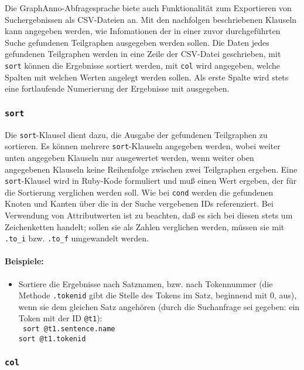 \documentclass[12pt]{scrartcl}
\begin{document}
Die GraphAnno-Abfragesprache biete auch Funktionalität zum Exportieren von Suchergebnissen als CSV-Dateien an. 
Mit den nachfolgen beschriebenen Klauseln kann angegeben werden, wie Infomationen der in einer zuvor durchgeführten Suche gefundenen Teilgraphen ausgegeben werden sollen.
Die Daten jedes gefundenen Teilgraphen werden in eine Zeile der CSV-Datei geschrieben, mit \texttt{sort} können die Ergebnisse sortiert werden, mit \texttt{col} wird angegeben, welche Spalten mit welchen Werten angelegt werden sollen. Als erste Spalte wird stets eine fortlaufende Numerierung der Ergebnisse mit ausgegeben.

\subsubsection{\texttt{sort}}

Die \texttt{sort}-Klausel dient dazu, die Ausgabe der gefundenen Teilgraphen zu sortieren. Es können mehrere \texttt{sort}-Klauseln angegeben werden, wobei weiter unten angegeben Klauseln nur ausgewertet werden, wenn  weiter oben angegebenen Klauseln keine Reihenfolge zwischen zwei Teilgraphen ergeben. 
Eine \texttt{sort}-Klausel wird in Ruby-Kode formuliert und muß einen Wert ergeben, der für die Sortierung verglichen werden soll. Wie bei \texttt{cond} werden die gefundenen Knoten und Kanten über die in der Suche vergebenen IDs referenziert. Bei Verwendung von Attributwerten ist zu beachten, daß es sich bei diesen stets um Zeichenketten handelt; sollen sie als Zahlen verglichen werden, müssen sie mit \texttt{.to\_i} bzw. \texttt{.to\_f} umgewandelt werden.

\paragraph*{Beispiele:}
\begin{itemize}
	\item Sortiere die Ergebnisse nach Satznamen, bzw. nach Tokennummer (die Methode \texttt{.tokenid} gibt die Stelle des Tokens im Satz, beginnend mit 0, aus), wenn sie dem gleichen Satz angehören (durch die Suchanfrage sei gegeben: ein Token mit der ID \texttt{@t1}):\\
	{\tt
	sort @t1.sentence.name\\[-.4ex]
	sort @t1.tokenid\\[-.4ex]
	}
\end{itemize}



\subsubsection{\texttt{col}}
\end{document}
